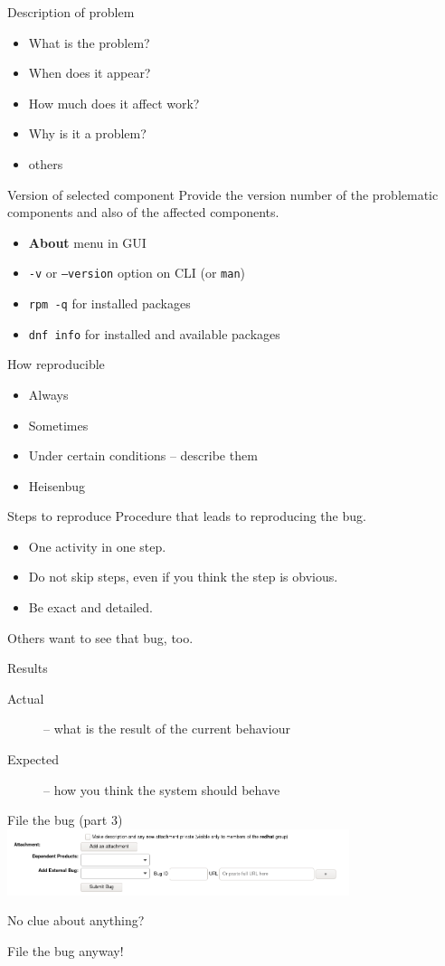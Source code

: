 \documentclass[12pt]{beamer}
\begin{document}
\begin{frame}{Description of problem}
\begin{itemize}
	\item What is the problem?
	\item When does it appear?
	\item How much does it affect work?
	\item Why is it a problem?
	\item others
\end{itemize}
\end{frame}

\begin{frame}{Version of selected component}
Provide the version number of the problematic components and also of the affected components.
\begin{itemize}
	\item \textbf{About} menu in GUI
	\item \texttt{-v} or \texttt{--version} option on CLI (or \texttt{man})
	\item \texttt{rpm -q} for installed packages
	\item \texttt{dnf info} for installed and available packages
\end{itemize}
\end{frame}

\begin{frame}{How reproducible}
\begin{itemize}
	\item Always
	\item Sometimes
	\item Under certain conditions -- describe them
	\item Heisenbug 
\end{itemize}
\end{frame}

\begin{frame}{Steps to reproduce}
Procedure that leads to reproducing the bug.
\begin{itemize}
	\item One activity in one step.
	\item Do not skip steps, even if you think the step is obvious.
	\item Be exact and detailed.
\end{itemize}
Others want to see that bug, too. 
\end{frame}

\begin{frame}{Results}
\begin{description}
	\item[Actual] -- what is the result of the current behaviour
	\item[Expected] -- how you think the system should behave
\end{description}
\end{frame}

\begin{frame}{File the bug (part 3)}
\includegraphics[width=10cm]{images/bz_footer.png}
\end{frame}

\begin{frame}{No clue about anything?}

{\Large File the bug anyway!}
\end{frame}
\end{document}
